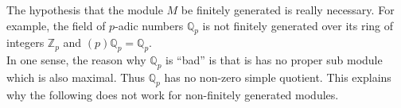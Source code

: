 \documentclass[12pt]{article}
\newcommand{\Q}{\mathbb{Q}}
\newcommand{\Z}{\mathbb{Z}}
\begin{document}
The hypothesis that the module $M$ be finitely generated is really
necessary. For example, the field of $p$-adic numbers $\Q_p$ is
not finitely generated over its ring of integers $\Z_p$ and
$(p)\Q_p = \Q_p$. \\

In one sense, the reason why $\Q_p$ is ``bad'' is that is has no
proper sub module which is also maximal. Thus $\Q_p$ has no non-zero simple
quotient. This explains why the following
does not work for non-finitely generated modules.
\end{document}
